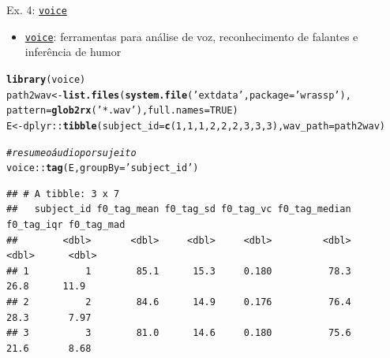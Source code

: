 \documentclass{beamer}\usepackage[]{graphicx}\usepackage[]{xcolor}
\makeatletter
\newcommand{\hlnum}[1]{\textcolor[rgb]{0.686,0.059,0.569}{#1}}%
\newcommand{\hlsng}[1]{\textcolor[rgb]{0.192,0.494,0.8}{#1}}%
\newcommand{\hlcom}[1]{\textcolor[rgb]{0.678,0.584,0.686}{\textit{#1}}}%
\newcommand{\hlopt}[1]{\textcolor[rgb]{0,0,0}{#1}}%
\newcommand{\hldef}[1]{\textcolor[rgb]{0.345,0.345,0.345}{#1}}%
\newcommand{\hlkwb}[1]{\textcolor[rgb]{0.69,0.353,0.396}{#1}}%
\newcommand{\hlkwc}[1]{\textcolor[rgb]{0.333,0.667,0.333}{#1}}%
\newcommand{\hlkwd}[1]{\textcolor[rgb]{0.737,0.353,0.396}{\textbf{#1}}}%
\newenvironment{kframe}{%
 \def\at@end@of@kframe{}%
 \ifinner\ifhmode%
  \def\at@end@of@kframe{\end{minipage}}%
  \begin{minipage}{\columnwidth}%
 \fi\fi%
 \def\FrameCommand##1{\hskip\@totalleftmargin \hskip-\fboxsep
 \colorbox{shadecolor}{##1}\hskip-\fboxsep
     \hskip-\linewidth \hskip-\@totalleftmargin \hskip\columnwidth}%
 \MakeFramed {\advance\hsize-\width
   \@totalleftmargin\z@ \linewidth\hsize
   \@setminipage}}%
 {\par\unskip\endMakeFramed%
 \at@end@of@kframe}
\newenvironment{knitrout}{}{} %
\makeatother
\begin{document}
\begin{frame}[fragile]{Ex. 4: \href{https://cran.r-project.org/web/packages/voice/index.html}{\texttt{voice}}}
  \begin{itemize}
    \item \href{https://github.com/filipezabala/voice/}{\texttt{voice}}: ferramentas para análise de voz, reconhecimento de falantes e inferência de humor
  \end{itemize}
  \pause
\fontsize{7pt}{7pt}\selectfont
\begin{knitrout}
\color{fgcolor}\begin{kframe}
\begin{alltt}
\hlkwd{library}\hldef{(voice)}
\hldef{path2wav} \hlkwb{<-} \hlkwd{list.files}\hldef{(}\hlkwd{system.file}\hldef{(}\hlsng{'extdata'}\hldef{,} \hlkwc{package} \hldef{=} \hlsng{'wrassp'}\hldef{),}
                       \hlkwc{pattern} \hldef{=} \hlkwd{glob2rx}\hldef{(}\hlsng{'*.wav'}\hldef{),} \hlkwc{full.names} \hldef{=} \hlnum{TRUE}\hldef{)}
\hldef{E} \hlkwb{<-} \hldef{dplyr}\hlopt{::}\hlkwd{tibble}\hldef{(}\hlkwc{subject_id} \hldef{=} \hlkwd{c}\hldef{(}\hlnum{1}\hldef{,}\hlnum{1}\hldef{,}\hlnum{1}\hldef{,}\hlnum{2}\hldef{,}\hlnum{2}\hldef{,}\hlnum{2}\hldef{,}\hlnum{3}\hldef{,}\hlnum{3}\hldef{,}\hlnum{3}\hldef{),} \hlkwc{wav_path} \hldef{= path2wav)}

\hlcom{# resume o áudio por sujeito}
\hldef{voice}\hlopt{::}\hlkwd{tag}\hldef{(E,} \hlkwc{groupBy} \hldef{=} \hlsng{'subject_id'}\hldef{)}
\end{alltt}
\begin{verbatim}
## # A tibble: 3 x 7
##   subject_id f0_tag_mean f0_tag_sd f0_tag_vc f0_tag_median f0_tag_iqr f0_tag_mad
##        <dbl>       <dbl>     <dbl>     <dbl>         <dbl>      <dbl>      <dbl>
## 1          1        85.1      15.3     0.180          78.3       26.8      11.9 
## 2          2        84.6      14.9     0.176          76.4       28.3       7.97
## 3          3        81.0      14.6     0.180          75.6       21.6       8.68
\end{verbatim}
\end{kframe}
\end{knitrout}
\end{frame}
\end{document}
